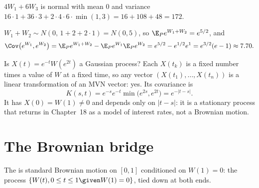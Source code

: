 \begin{example}
\label{ex:4w1-6w3}
$4W_1+6W_3$ is normal with mean $0$ and variance $16\cdot1+36\cdot3+2\cdot4\cdot6\cdot\min(1,3)=16+108+48=172$.
\end{example}

\begin{example}
\label{ex:cov-exp}
$W_1+W_2\sim N(0,\,1+2+2\cdot1)=N(0,5)$, so $\E_Pe^{W_1+W_2}=e^{5/2}$, and
\[
  \Cov\big(e^{W_1},e^{W_2}\big)=\E_Pe^{W_1+W_2}-\E_Pe^{W_1}\E_Pe^{W_2}=e^{5/2}-e^{1/2}e^{1}=e^{3/2}(e-1)\approx7.70 .
\]
\end{example}

\begin{example}
\label{ex:time-change}
Is $X(t)=e^{-t}W(e^{2t})$ a Gaussian process? Each $X(t_k)$ is a fixed number times a value of $W$ at a fixed time, so any vector $(X(t_1),\dots,X(t_n))$ is a linear transformation of an MVN vector: yes. Its covariance is
\[
  K(s,t)=e^{-s}e^{-t}\min\big(e^{2s},e^{2t}\big)=e^{-|t-s|} .
\]
It has $X(0)=W(1)\ne0$ and depends only on $|t-s|$: it is a stationary process that returns in Chapter~18 as a model of interest rates, not a Brownian motion.
\end{example}

\section{The Brownian bridge}

\begin{definition}
The  is standard Brownian motion on $[0,1]$ conditioned on $W(1)=0$: the process $\{W(t),0\le t\le1\given W(1)=0\}$, tied down at both ends.
\end{definition}

